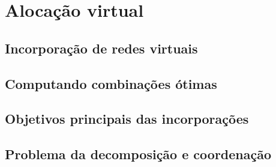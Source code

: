 \chapter{Alocação virtual}
\label{ch:alocacaoVirtual}

\section{Incorporação de redes virtuais}

\section{Computando combinações ótimas}

\section{Objetivos principais das incorporações}

\section{Problema da decomposição e coordenação}